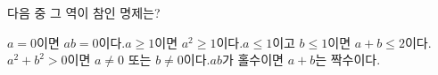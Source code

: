 다음 중 그 역이 참인 명제는? 
\begin{choicesv}{$a=0$이면 $ab=0$이다.}{$a\ge 1$이면 $a^2\ge 1$이다.}{$a\le 1$이고 $b\le 1$이면 $a+b\le 2$이다.}{$a^2+b^2>0$이면 $a\ne 0$ 또는 $b\ne 0$이다.}{$ab$가 홀수이면 $a+b$는 짝수이다.}\end{choicesv}
